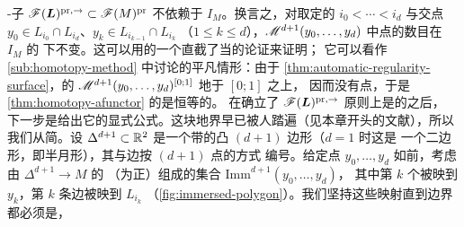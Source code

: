 \trAinfty-子\trCategory{} $\scr{F}(\boldsymbol{L})^{\mathrm{pr},\to}\subset%
\scr{F}(M)^{\mathrm{pr}}$ 不依赖于\trComplexStructure{} $I_M$。换言之，对取定的%
$i_0<\cdots<i_d$ 与交点 $y_0\in L_{i_0}\cap L_{i_d}$、$y_k\in L_{i_{k-1}}\cap L_{i_k}$
（$1\le k\le d$），$\mathscr{M}^{d+1}(y_0,\ldots,y_d)$ 中\trIsolated{}点的数目在 $I_M$ 的%
\trHomotopy{}下不变。这可以用\trModuliSpace{}的一个直截了当的\trCobordism{}论证来证明；%
它可以看作 \cref{sub:homotopy-method} 中讨论的平凡情形：由于%
\cref{thm:automatic-regularity-surface}，\trParametrization{}的\trModuliSpace{}
$\mathscr{M}^{d+1}(y_0,\ldots,y_d)^{[0;1]}$ \trSmooth{}地\trFibration{}于 $[0;1]$ 之上，%
因而没有\trIsolated{}点，于是\cref{thm:homotopy-afunctor} 的\trAFunctor{}是恒等的。
在确立了 $\mathscr{F}(\boldsymbol{L})^{\mathrm{pr},\to}$ 原则上是\trTopology{}的之后，%
下一步是给出它的显式公式。这块地界早已被人踏遍（见本章开头的文献），所以我们从简。设%
$\Delta^{d+1}\subset\mathbb{R}^2$ 是一个带\trOrientation{}的凸 $(d{+}1)$ 边形（$d=1$ 时这是%
一个二边形，即半月形），其\trCornerPoint{}与边按 $(d{+}1)$ 点\trPointedDisc{}的方式%
编号。给定点 $y_0,\ldots,y_d$ 如前，考虑由 $\Delta^{d+1}\to M$ 的\trSmooth{}%
\trImmersion{}（\trOrientation{}为正）组成的集合 $\mathrm{Imm}^{d+1}(y_0,\ldots,y_d)$，%
其中第 $k$ 个\trCornerPoint{}被映到 $y_k$，第 $k$ 条边被映到 $L_{i_k}$
（\cref{fig:immersed-polygon}）。我们坚持这些映射直到边界都必须是\trImmersion，
